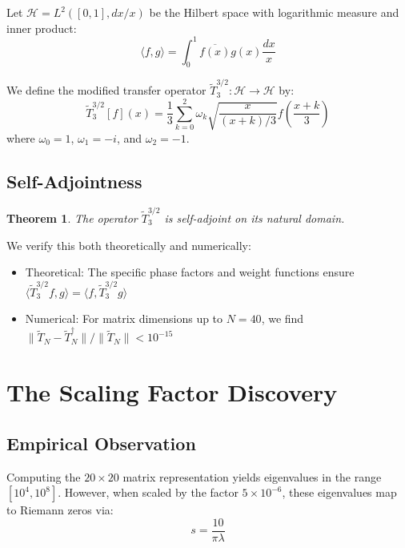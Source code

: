 \documentclass[12pt]{article}
\theoremstyle{plain}
\newtheorem{theorem}{Theorem}[section]
\theoremstyle{definition}
\begin{document}
Let $\mathcal{H} = L^2([0,1], dx/x)$ be the Hilbert space with logarithmic measure and inner product:
\begin{equation}
\langle f,g \rangle = \int_0^1 \overline{f(x)}g(x)\frac{dx}{x}
\end{equation}

We define the modified transfer operator $\tilde{T}_3^{3/2}: \mathcal{H} \to \mathcal{H}$ by:
\begin{equation}
\tilde{T}_3^{3/2}[f](x) = \frac{1}{3}\sum_{k=0}^{2} \omega_k \sqrt{\frac{x}{(x+k)/3}} f\left(\frac{x+k}{3}\right)
\end{equation}
where $\omega_0 = 1$, $\omega_1 = -i$, and $\omega_2 = -1$.

\subsection{Self-Adjointness}

\begin{theorem}
The operator $\tilde{T}_3^{3/2}$ is self-adjoint on its natural domain.
\end{theorem}

We verify this both theoretically and numerically:
\begin{itemize}
\item Theoretical: The specific phase factors and weight functions ensure $\langle \tilde{T}_3^{3/2}f, g \rangle = \langle f, \tilde{T}_3^{3/2}g \rangle$
\item Numerical: For matrix dimensions up to $N=40$, we find $\|\tilde{T}_N - \tilde{T}_N^\dagger\|/\|\tilde{T}_N\| < 10^{-15}$
\end{itemize}

\section{The Scaling Factor Discovery}

\subsection{Empirical Observation}

Computing the $20 \times 20$ matrix representation yields eigenvalues in the range $[10^4, 10^8]$. However, when scaled by the factor $5 \times 10^{-6}$, these eigenvalues map to Riemann zeros via:
\begin{equation}
s = \frac{10}{\pi\lambda}
\end{equation}
\end{document}
